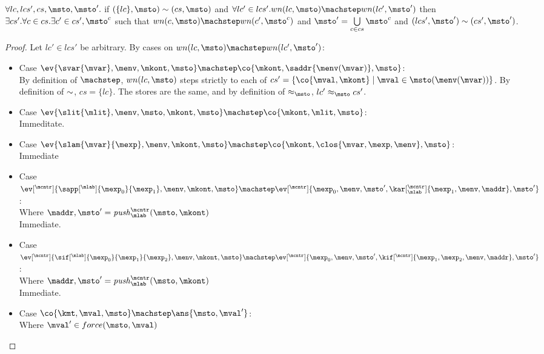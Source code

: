 \begin{lemma}
$\forall lc, lcs', cs, \msto, \msto'.$
 if  $\capprx{(\{lc\},\msto)}{(cs,\msto)}$
 and $\forall lc' \in lcs'. wn(lc,\msto) \machstep wn(lc', \msto')$ then
 $\exists cs'. \forall c \in cs. \exists c' \in cs', \msto^c$
 such that $wn(c,\msto) \machstep wn(c', \msto^c)$
 and       $\msto' = \bigcup\limits_{c \in cs}{\msto^c}$
 and       $\capprx{(lcs',\msto')}{(cs',\msto')}$.
\end{lemma}
\begin{proof}
Let $lc' \in lcs'$ be arbitrary.
By cases on $wn(lc,\msto) \machstep wn(lc', \msto')$:
\begin{itemize}
\item{Case $\ev{\svar{\mvar}, \menv, \mkont, \msto} \machstep \co{\mkont,
    \saddr{\menv(\mvar)}, \msto}$: \\ By definition of $\machstep$,
  $wn(lc,\msto)$ steps strictly to each of $cs' = \{\co{\mval, \mkont} \mid \mval \in \msto(\menv(\mvar))\}$.  By definition of
  $\sim$, $cs = \{lc\}$. The stores are the same, and by
  definition of $\lapprx{}{\msto}{}$, $\lapprx{lc'}{\msto}{cs'}$.}
\item{Case $\ev{\slit{\mlit}, \menv, \msto, \mkont, \msto} \machstep
            \co{\mkont, \mlit, \msto}$: \\
      Immeditate.}
\item{Case $\ev{\slam{\mvar}{\mexp}, \menv, \mkont, \msto} \machstep
            \co{\mkont, \clos{\mvar, \mexp, \menv}, \msto}$: \\
      Immediate}
\item{Case $\ev[^\mcntr]{\sapp[^\mlab]{\mexp_0}{\mexp_1}, \menv, \mkont, \msto} \machstep
            \ev[^\mcntr]{\mexp_0, \menv, \msto', \kar[^\mcntr_\mlab]{\mexp_1, \menv, \maddr}, \msto'}$: \\
      Where $\maddr, \msto' = \mathit{push}_\mlab^\mcntr(\msto,\mkont)$ \\
      Immediate.}
\item{Case $\ev[^\mcntr]{\sif[^\mlab]{\mexp_0}{\mexp_1}{\mexp_2}, \menv, \mkont, \msto} \machstep
            \ev[^\mcntr]{\mexp_0, \menv, \msto', \kif[^\mcntr]{\mexp_1, \mexp_2, \menv, \maddr}, \msto'}$: \\
      Where $\maddr, \msto' = \mathit{push}_\mlab^\mcntr(\msto,\mkont)$ \\
      Immediate.}
\item{Case $\co{\kmt, \mval, \msto} \machstep \ans{\msto, \mval'}$: \\
      Where $\mval' \in force(\msto, \mval)$ \\
}
\end{itemize}
\end{proof}
